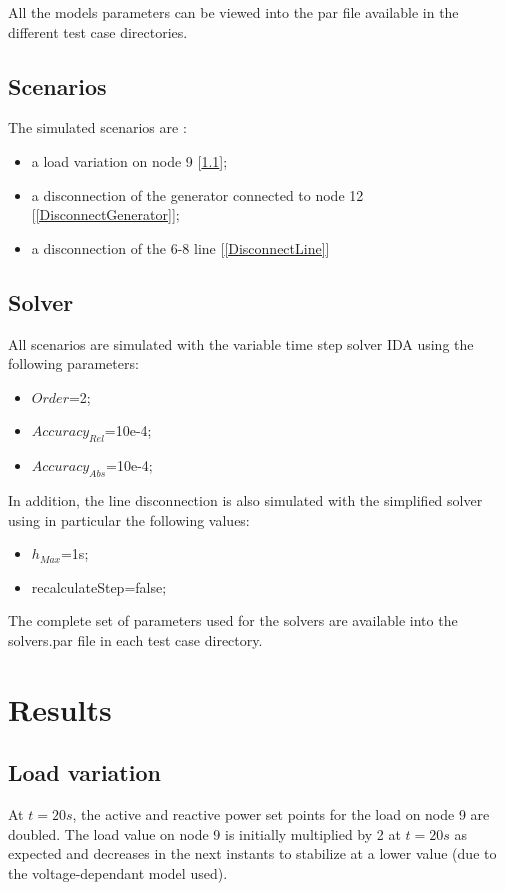 \documentclass[a4paper, 12pt]{report}
\begin{document}
All the models parameters can be viewed into the par file available in the different test case directories.

\subsection{Scenarios}
The simulated scenarios are :
\begin{itemize}
\item a load variation on node 9 [\ref{LoadVariation}];
\item a disconnection of the generator connected to node 12 [\ref{DisconnectGenerator}];
\item a disconnection of the 6-8 line [\ref{DisconnectLine}]
\end{itemize}

\subsection{Solver}
All scenarios are simulated with the variable time step solver IDA using the following parameters:
\begin{itemize}
\item $Order$=2;
\item $Accuracy_{Rel}$=10e-4;
\item $Accuracy_{Abs}$=10e-4;
\end{itemize}

In addition, the line disconnection is also simulated with the simplified solver using in particular the following values:
\begin{itemize}
\item $h_{Max}$=1s;
\item recalculateStep=false;
\end{itemize}

The complete set of parameters used for the solvers are available into the solvers.par file in each test case directory.

\newpage
\section{Results}

\subsection{Load variation}
\label{LoadVariation}

At $t=20s$, the active and reactive power set points for the load on node 9 are doubled. The load value on node 9 is initially multiplied by 2 at $t=20s$ as expected and decreases in the next instants to stabilize at a lower value (due to the voltage-dependant model used). \\
\end{document}
